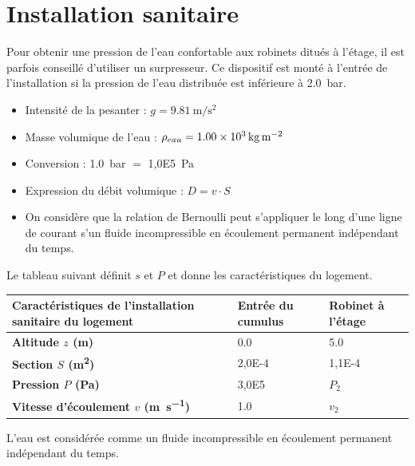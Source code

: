 \documentclass[a4paper,11pt,fleqn]{scrartcl}%
\begin{document}
\maketitle
\section{Installation sanitaire}
Pour obtenir une pression de l'eau confortable aux robinets ditués à l'étage, il est parfois conseillé d'utiliser un surpresseur. Ce dispositif est monté à l'entrée de l'installation si la pression de l'eau distribuée est inférieure à \SI{2,0}{\bar}.
\begin{data}
    \begin{itemize}
        \item Intensité de la pesanter : $g =\SI{9,81}{\meter\per\second\squared}$
        \item Masse volumique de l'eau : $\rho_{eau} = \SI{1,00E3}{\kilo\gram\per\meter\squared}$
        \item Conversion : \SI{1,0}{\bar} $=$ \SI{1,0E5}{\pascal}
        \item Expression du débit volumique : $D = v \cdot S$
        \item On considère que la relation de Bernoulli peut s'appliquer le long d'une ligne de courant s'un fluide incompressible en écoulement permanent indépendant du temps.
    \end{itemize}
    Le tableau suivant définit $s$ et $P$ et donne les caractéristiques du logement.
    \begin{center}
        \begin{tabular}{|>{\centering}m{.3\linewidth}|>{\centering}m{.3\linewidth}|>{\centering\arraybackslash}m{.3\linewidth}|}
            \hline
            \textbf{Caractéristiques de l'installation sanitaire du logement} & \textbf{Entrée du cumulus} & \textbf{Robinet à l'étage}\\
            \hline
            \textbf{Altitude $z$ (\unit{\meter})} & \num{0,0} & \num{5,0}\\
            \hline
            \textbf{Section $S$ (\unit{\meter\squared})} & \num{2,0E-4} & \num{1,1E-4}\\
            \hline
            \textbf{Pression $P$ (\unit{\pascal})} & \num{3,0E5} & $P_2$\\
            \hline
            \textbf{Vitesse d'écoulement $v$ (\unit{\meter\per\second})} & \num{1,0} & $v_2$\\
            \hline
        \end{tabular}
    \end{center}
\end{data}
L'eau est considérée comme un fluide incompressible en écoulement permanent indépendant du temps.
\end{document}
